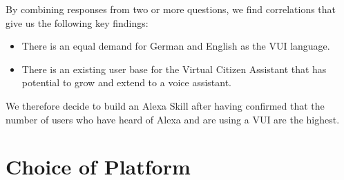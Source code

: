 By combining responses from two or more questions, we find correlations that give us the following key findings: 

\begin{itemize}
	
	\item There is an equal demand for German and English as the VUI language.
	
	\item There is an existing user base for the Virtual Citizen Assistant that has potential to grow and extend to a voice assistant.
\end{itemize}
%


We therefore decide to build an Alexa Skill after having confirmed that the number of users who have heard of Alexa and are using a VUI are the highest.




%


%
%	
%






%
%
%
%	

\section{Choice of Platform} %
\label{choiceOfPlatform}

